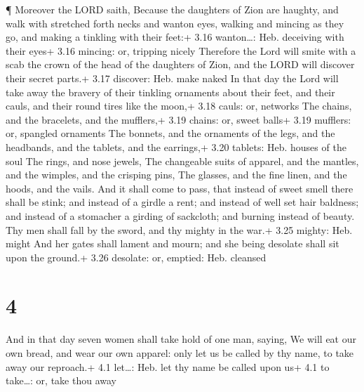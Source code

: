  ¶ Moreover the LORD saith, Because the daughters of Zion
are haughty, and walk with stretched forth necks and wanton eyes,
walking and mincing as they go, and making a tinkling with their feet:+
3.16 wanton\ldots: Heb. deceiving with their eyes+ 3.16 mincing: or,
tripping nicely  Therefore the Lord will smite with a scab
the crown of the head of the daughters of Zion, and the LORD will
discover their secret parts.+ 3.17 discover: Heb. make naked
 In that day the Lord will take away the bravery of their
tinkling ornaments about their feet, and their cauls, and their round
tires like the moon,+ 3.18 cauls: or, networks  The chains,
and the bracelets, and the mufflers,+ 3.19 chains: or, sweet balls+ 3.19
mufflers: or, spangled ornaments  The bonnets, and the
ornaments of the legs, and the headbands, and the tablets, and the
earrings,+ 3.20 tablets: Heb. houses of the soul  The
rings, and nose jewels,  The changeable suits of apparel,
and the mantles, and the wimples, and the crisping pins, 
The glasses, and the fine linen, and the hoods, and the vails.
 And it shall come to pass, that instead of sweet smell
there shall be stink; and instead of a girdle a rent; and instead of
well set hair baldness; and instead of a stomacher a girding of
sackcloth; and burning instead of beauty.  Thy men shall
fall by the sword, and thy mighty in the war.+ 3.25 mighty: Heb. might
 And her gates shall lament and mourn; and she being
desolate shall sit upon the ground.+ 3.26 desolate: or, emptied: Heb.
cleansed

\hypertarget{section-3}{%
\section{4}\label{section-3}}

 And in that day seven women shall take hold of one man,
saying, We will eat our own bread, and wear our own apparel: only let us
be called by thy name, to take away our reproach.+ 4.1 let\ldots: Heb.
let thy name be called upon us+ 4.1 to take\ldots: or, take thou away


